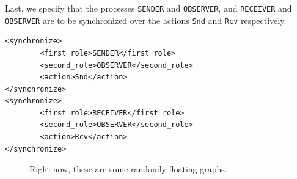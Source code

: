 Last, we specify that the processes \texttt{SENDER} and \texttt{OBSERVER}, and  \texttt{RECEIVER} and \texttt{OBSERVER} are to be synchronized over the actions \texttt{Snd} and \texttt{Rcv} respectively. 

\begin{lstlisting}[frame=single]
<synchronize>
        <first_role>SENDER</first_role>
        <second_role>OBSERVER</second_role>
        <action>Snd</action>
</synchronize>
<synchronize>
        <first_role>RECEIVER</first_role>
        <second_role>OBSERVER</second_role>
        <action>Rcv</action>
</synchronize>
\end{lstlisting}

\begin{figure}
\caption{Right now, these are some randomly floating graphs.}
\swreceiver

\swobserver

\swsender
\end{figure}
